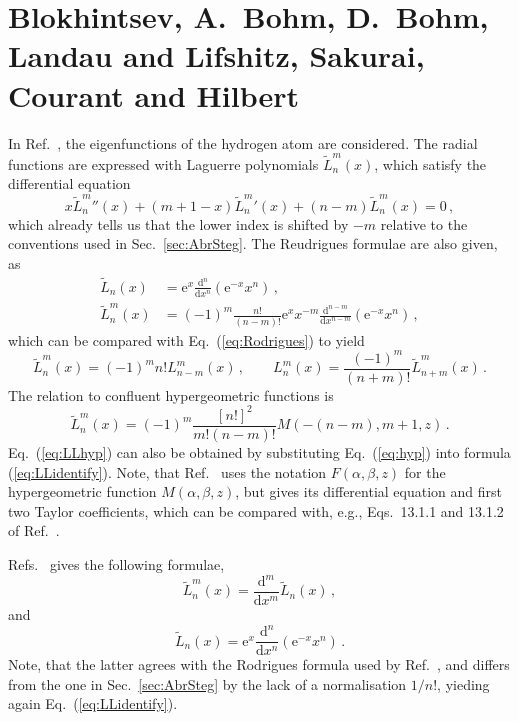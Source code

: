 \documentclass[a4paper,12pt,final]{article}
\def\d{\mathrm{d}}
\def\e{\mathrm{e}}
\begin{document}
\section{Blokhintsev, A.~Bohm, D.~Bohm, Landau and Lifshitz, Sakurai, Courant and Hilbert}
In Ref.\ \cite{LL}, the eigenfunctions of the hydrogen atom are considered. The radial functions are expressed with Laguerre polynomials ${\tilde L}_n^m(x)$, which satisfy the differential equation
\begin{equation}
x {\tilde L }_n^m{}''(x) + (m+1-x){\tilde L}_n^m{}'(x) + (n-m) {\tilde L}_n^m (x) =0\,, 
\end{equation}
which already tells us that the lower index is shifted by $-m$ relative to the conventions used in Sec.\ \ref{sec:AbrSteg}. The Reudrigues formulae are also given, as
\begin{equation}
 \label{eq:LLRodrigues}
 \begin{aligned}
  {\tilde L}_n (x) &= \e^x \frac{\d^n}{\d x^n}(\e^{-x} x^n)\,,\\
  {\tilde L}_n^m (x) &= (-1)^m \frac{n!}{(n-m)!} \e^x x^{-m}\frac{\d^{n-m}}{\d x^{n-m}}(\e^{-x}x^n)\,,
 \end{aligned}
\end{equation}
which can be compared with Eq.\ (\ref{eq:Rodrigues}) to yield
\begin{equation}
 \label{eq:LLidentify}
 {\tilde L}_n^m(x) = (-1)^m n! L_{n-m}^m(x)\,,\quad\quad L_n^m(x) = \frac{(-1)^m}{(n+m)!} {\tilde L}_{n+m}^m (x)\,.
\end{equation}
The relation to confluent hypergeometric functions is
\begin{equation}
 \label{eq:LLhyp}
 {\tilde L}_n^m(x) = (-1)^m \frac{[n!]^2}{m! (n-m)!}M(-(n-m),m+1,z)\,.
\end{equation}
Eq.\ (\ref{eq:LLhyp}) can also be obtained by substituting Eq.\ (\ref{eq:hyp}) into formula (\ref{eq:LLidentify}). Note, that Ref.\ \cite{LL} uses the notation $F(\alpha, \beta,z)$ for the hypergeometric function $M(\alpha,\beta,z)$, but gives its differential equation and first two Taylor coefficients, which can be compared with, e.g., Eqs.\ 13.1.1 and 13.1.2 of Ref.\ \cite{AbrSteg}.

Refs.\ \cite{Blokhintsev, DBohm, Sakurai, CH} gives the following formulae,
\begin{equation}\label{eq:SAGeneralized}
 {\tilde L}_n^m(x) = \frac{\d^m}{\d x^m}{\tilde L}_n(x)\,,
\end{equation}
and
\begin{equation}\label{eq:SARodrigues}
 {\tilde L}_n(x) = \e^x \frac{\d^n}{\d x^n} (\e^{-x} x^n)\,.
\end{equation}
Note, that the latter agrees with the Rodrigues formula used by Ref.\ \cite{LL}, and differs from the one in Sec.\ \ref{sec:AbrSteg} by the lack of a normalisation $1/n!$, yieding again Eq.\ (\ref{eq:LLidentify}).
\end{document}
